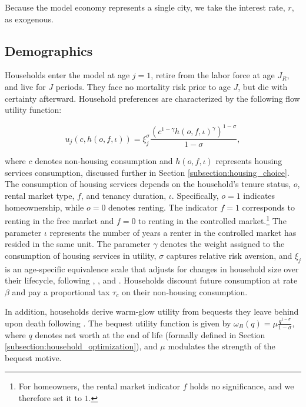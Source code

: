 \documentclass[parskip=full]{article}
\begin{document}
Because the model economy represents a single city, we take the interest rate, $r$, as exogenous. 

\subsection{Demographics}\label{subsection:demographics}

Households enter the model at age $j=1$, retire from the labor force at age $J_{R}$, and live for $J$ periods. They face no mortality risk prior to age $J$, but die with certainty afterward. Household preferences are characterized by the following flow utility function:

\begin{equation*}
    u_{j}(c,h(o,f,\iota))=\xi_{j}^{\sigma}\frac{\left(c^{1-\gamma} h(o,f,\iota)^{\gamma}\right)^{1-\sigma}}{1-\sigma},
\end{equation*}

\noindent where $c$ denotes non-housing consumption and $h(o,f,\iota)$ represents housing services consumption, discussed further in Section \ref{subsection:housing_choice}. The consumption of housing services depends on the household's tenure status, $o$, rental market type, $f$, and tenancy duration, $\iota$. Specifically, $o=1$ indicates homeownership, while $o=0$ denotes renting. The indicator $f=1$ corresponds to renting in the free market and $f=0$ to renting in the controlled market.\footnote{For homeowners, the rental market indicator $f$ holds no significance, and we therefore set it to $1$.} The parameter $\iota$ represents the number of years a renter in the controlled market has resided in the same unit. The parameter $\gamma$ denotes the weight assigned to the consumption of housing services in utility, $\sigma$ captures relative risk aversion, and $\xi_{j}$ is an age-specific equivalence scale that adjusts for changes in household size over their lifecycle, following \citet{lm-1980}, \citet{wz-2010}, and \citet{xu-2013}. Households discount future consumption at rate $\beta$ and pay a proportional tax $\tau_{c}$ on their non-housing consumption.

In addition, households derive warm-glow utility from bequests they leave behind upon death following \citet{cagetti-denardi-2006}. The bequest utility function is given by $\omega_{B}(q)=\mu \frac{q^{1-\sigma}}{1-\sigma}$, where $q$ denotes net worth at the end of life (formally defined in Section \ref{subsection:household_optimization}), and $\mu$ modulates the strength of the bequest motive.
\end{document}

